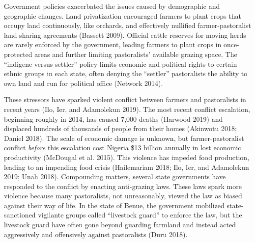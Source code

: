 \documentclass[11pt]{article}
\begin{document}
Government policies exacerbated the issues caused by demographic and
geographic changes. Land privatization encouraged farmers to plant crops
that occupy land continuously, like orchards, and effectively nullified
farmer-pastoralist land sharing agreements (Bassett 2009). Official
cattle reserves for moving herds are rarely enforced by the government,
leading farmers to plant crops in once-protected areas and further
limiting pastoralists' available grazing space. The ``indigene versus
settler'' policy limits economic and political rights to certain ethnic
groups in each state, often denying the ``settler'' pastoralists the
ability to own land and run for political office (Network 2014).

These stressors have sparked violent conflict between farmers and
pastoralists in recent years (Ilo, Ier, and Adamolekun 2019). The most
recent conflict escalation, beginning roughly in 2014, has caused 7,000
deaths (Harwood 2019) and displaced hundreds of thousands of people from
their homes (Akinwotu 2018; Daniel 2018). The scale of economic damage
is unknown, but farmer-pastoralist conflict \emph{before} this
escalation cost Nigeria \$13 billion annually in lost economic
productivity (McDougal et al. 2015). This violence has impeded food
production, leading to an impending food crisis (Hailemariam 2018; Ilo,
Ier, and Adamolekun 2019; Unah 2018). Compounding matters, several state
governments have responded to the conflict by enacting anti-grazing
laws. These laws spark more violence because many pastoralists, not
unreasonably, viewed the law as biased against their way of life. In the
state of Benue, the government mobilized state-sanctioned vigilante
groups called ``livestock guard'' to enforce the law, but the livestock
guard have often gone beyond guarding farmland and instead acted
aggressively and offensively against pastoralists (Duru 2018).
\end{document}
